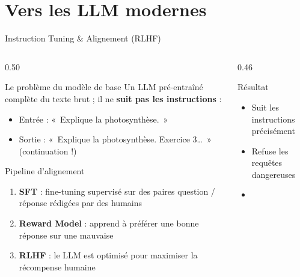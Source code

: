 \documentclass[aspectratio=169, 10pt]{beamer}
\begin{document}
\section{Vers les LLM modernes}

\begin{frame}{Instruction Tuning \& Alignement (RLHF)}
  \begin{columns}[T]
    \begin{column}{0.50\textwidth}
      \begin{alertblock}{Le problème du modèle de base}
        Un LLM pré-entraîné complète du texte brut ;
        il ne \textbf{suit pas les instructions} :
        \begin{itemize}
          \item Entrée : «~Explique la photosynthèse.~»
          \item Sortie : «~Explique la photosynthèse.
                Exercice 3\ldots~» (continuation !)
        \end{itemize}
      \end{alertblock}
      \smallskip
      \begin{block}{Pipeline d'alignement}
        \begin{enumerate}
          \item \textbf{SFT} : fine-tuning supervisé sur des paires
                question / réponse rédigées par des humains
          \item \textbf{Reward Model} : apprend à préférer
                une bonne réponse sur une mauvaise
          \item \textbf{RLHF} : le LLM est optimisé pour
                maximiser la récompense humaine
        \end{enumerate}
      \end{block}
    \end{column}
    \begin{column}{0.46\textwidth}
      \begin{exampleblock}{Résultat}
        \begin{itemize}
          \item[\textcolor{jedy_example}{$+$}]
                Suit les instructions précisément
          \item[\textcolor{jedy_example}{$+$}]
                Refuse les requêtes dangereuses
          \item[\textcolor{jedy_example}{$+$}]

\end{itemize}
\end{exampleblock}
\end{column}
\end{columns}
\end{frame}
\end{document}
